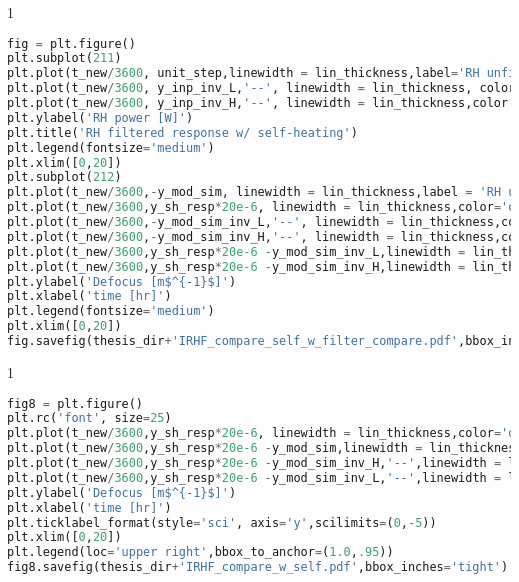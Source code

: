\begin{spacing}{1} \begin{lstlisting}[language=Python]
fig = plt.figure()
plt.subplot(211)
plt.plot(t_new/3600, unit_step,linewidth = lin_thickness,label='RH unfiltered step input')
plt.plot(t_new/3600, y_inp_inv_L,'--', linewidth = lin_thickness, color = 'green',label='RH conditioned input (G$_{1}$(s))')
plt.plot(t_new/3600, y_inp_inv_H,'--', linewidth = lin_thickness,color = 'red', label='RH conditioned input (G$_{2}$(s)')
plt.ylabel('RH power [W]')
plt.title('RH filtered response w/ self-heating')
plt.legend(fontsize='medium')
plt.xlim([0,20])
plt.subplot(212)
plt.plot(t_new/3600,-y_mod_sim, linewidth = lin_thickness,label = 'RH unfiltered step input')
plt.plot(t_new/3600,y_sh_resp*20e-6, linewidth = lin_thickness,color='orange',label ='self heating')
plt.plot(t_new/3600,-y_mod_sim_inv_L,'--', linewidth = lin_thickness,color='green',label ='RH conditioned input (G$_{1}$(s))')
plt.plot(t_new/3600,-y_mod_sim_inv_H,'--', linewidth = lin_thickness,color='red',label ='RH conditioned input (G$_{2}$(s)')
plt.plot(t_new/3600,y_sh_resp*20e-6 -y_mod_sim_inv_L,linewidth = lin_thickness,label='self heating + RH conditioned input (G$_{1}$(s)',color='purple')
plt.plot(t_new/3600,y_sh_resp*20e-6 -y_mod_sim_inv_H,linewidth = lin_thickness,label='self heating + RH conditioned input (G$_{2}$(s))',color='magenta')
plt.ylabel('Defocus [m$^{-1}$]')
plt.xlabel('time [hr]')
plt.legend(fontsize='medium')
plt.xlim([0,20])
fig.savefig(thesis_dir+'IRHF_compare_self_w_filter_compare.pdf',bbox_inches='tight')
\end{lstlisting} \end{spacing}


\begin{spacing}{1} \begin{lstlisting}[language=Python]
fig8 = plt.figure()
plt.rc('font', size=25)
plt.plot(t_new/3600,y_sh_resp*20e-6, linewidth = lin_thickness,color='orange',label ='self heating with no RH')
plt.plot(t_new/3600,y_sh_resp*20e-6 -y_mod_sim,linewidth = lin_thickness,label='self heating + RH unfiltered input',color='purple')
plt.plot(t_new/3600,y_sh_resp*20e-6 -y_mod_sim_inv_H,'--',linewidth = lin_thickness,label='self heating + RH filtered input (H$^{-1}$(s)*G$_{1}$(s))',color='red')
plt.plot(t_new/3600,y_sh_resp*20e-6 -y_mod_sim_inv_L,'--',linewidth = lin_thickness,label='self heating + RH filtered input (H$^{-1}$(s)*G$_{2}$(s))',color='green')
plt.ylabel('Defocus [m$^{-1}$]')
plt.xlabel('time [hr]')
plt.ticklabel_format(style='sci', axis='y',scilimits=(0,-5))
plt.xlim([0,20])
plt.legend(loc='upper right',bbox_to_anchor=(1.0,.95))
fig8.savefig(thesis_dir+'IRHF_compare_w_self.pdf',bbox_inches='tight')
\end{lstlisting} \end{spacing}

